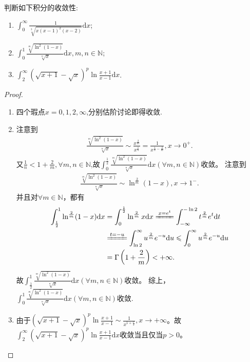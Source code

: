 \documentclass[../../main.tex]{subfiles}%
\begin{document}
\begin{example}
判断如下积分的收敛性:
\begin{enumerate}
\item  \(\int_{0}^{\infty}\frac{1}{\sqrt[3]{x(x - 1)^2(x - 2)}}\mathrm{d}x\);

\item \(\int_{0}^{1}\frac{\sqrt[m]{\ln^2(1 - x)}}{\sqrt[n]{x}}\mathrm{d}x, m,n\in\mathbb{N}\);

\item \(\int_{2}^{\infty}(\sqrt{x + 1}-\sqrt{x})^p\ln\frac{x + 1}{x - 1}\mathrm{d}x\).
\end{enumerate}
\end{example}
\begin{proof}
\begin{enumerate}
\item 四个瑕点$x=0,1,2,\infty$,分别估阶讨论即得收敛.

\item 注意到
\begin{align*}
\frac{\sqrt[m]{\ln ^2(1 - x)}}{\sqrt[n]{x}}\sim\frac{x^{\frac{2}{m}}}{x^{\frac{1}{n}}}=\frac{1}{x^{\frac{1}{n}-\frac{2}{m}}},x\rightarrow 0^+.
\end{align*}
又\(\frac{1}{n}<1+\frac{2}{m},\forall m,n\in \mathbb{N}\),故\(\int_{0}^{\frac{1}{2}}\frac{\sqrt[m]{\ln ^2(1 - x)}}{\sqrt[n]{x}}\mathrm{d}x\left( \forall m,n\in \mathbb{N} \right)\)收敛。
注意到
\begin{align*}
\frac{\sqrt[m]{\ln ^2(1 - x)}}{\sqrt[n]{x}}\sim\ln ^{\frac{2}{m}}(1 - x),x\rightarrow 1^-.
\end{align*}
并且对\(\forall m\in \mathbb{N}\)，都有
\begin{align*}
\int_{\frac{1}{2}}^1{\ln ^{\frac{2}{m}}(1}-x)\mathrm{d}x&=\int_0^{\frac{1}{2}}{\ln ^{\frac{2}{m}}x\mathrm{d}x\xlongequal{x=e^t}\int_{-\infty}^{-\ln 2}{t^{\frac{2}{m}}e^t\mathrm{d}t}}
\\
&\xlongequal{t=-u}\int_{\ln 2}^{\infty}{u^{\frac{2}{m}}e^{-u}\mathrm{d}u}\leqslant \int_0^{\infty}{u^{\frac{2}{m}}e^{-u}\mathrm{d}u}
\\
&=\Gamma \left( 1+\frac{2}{m} \right) <+\infty .
\end{align*}
故\(\int_{\frac{1}{2}}^{1}\frac{\sqrt[m]{\ln ^2(1 - x)}}{\sqrt[n]{x}}\mathrm{d}x\left( \forall m,n\in \mathbb{N} \right)\)收敛。
综上，\(\int_{0}^{1}\frac{\sqrt[m]{\ln ^2(1 - x)}}{\sqrt[n]{x}}\mathrm{d}x\left( \forall m,n\in \mathbb{N} \right)\)收敛.

\item 由于\((\sqrt{x + 1} - \sqrt{x})^p\ln\frac{x + 1}{x - 1}\sim\frac{1}{x^{1+\frac{p}{2}}},x\rightarrow +\infty\)。故\(\int_{2}^{\infty}(\sqrt{x + 1} - \sqrt{x})^p\ln\frac{x + 1}{x - 1} \mathrm{d}x\)收敛当且仅当\(p > 0\)。 
\end{enumerate}
\end{proof}
\end{document}
